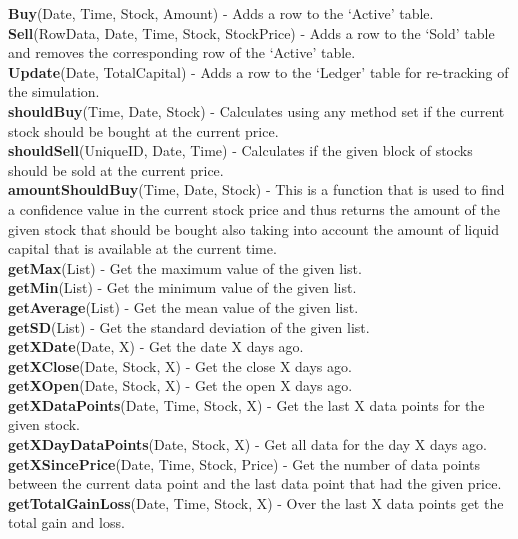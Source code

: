 \documentclass[12pt,a4paper]{article}
\begin{document}
\noindent
\textbf{Buy}(Date, Time, Stock, Amount) - Adds a row to the `Active' table. \\
\noindent
\textbf{Sell}(RowData, Date, Time, Stock, StockPrice) - Adds a row to the `Sold' table and removes the corresponding row of the `Active' table.\\
\noindent
\textbf{Update}(Date, TotalCapital) - Adds a row to the `Ledger' table for re-tracking of the simulation.\\
\noindent
\textbf{shouldBuy}(Time, Date, Stock) - Calculates using any method set if the current stock should be bought at the current price.\\
\noindent
\textbf{shouldSell}(UniqueID, Date, Time) - Calculates if the given block of stocks should be sold at the current price.\\
\noindent
\textbf{amountShouldBuy}(Time, Date, Stock) - This is a function that is used to find a confidence value in the current stock price and thus returns the amount of the given stock that should be bought also taking into account the amount of liquid capital that is available at the current time.\\
\noindent
\textbf{getMax}(List) - Get the maximum value of the given list.\\
\noindent
\textbf{getMin}(List) - Get the minimum value of the given list.\\
\noindent
\textbf{getAverage}(List) - Get the mean value of the given list.\\
\noindent
\textbf{getSD}(List) - Get the standard deviation of the given list.\\
\noindent
\textbf{getXDate}(Date, X) - Get the date X days ago.\\
\noindent
\textbf{getXClose}(Date, Stock, X) - Get the close X days ago.\\
\noindent
\textbf{getXOpen}(Date, Stock, X) - Get the open X days ago.\\
\noindent
\textbf{getXDataPoints}(Date, Time, Stock, X) - Get the last X data points for the given stock.\\
\noindent
\textbf{getXDayDataPoints}(Date, Stock, X) - Get all data for the day X days ago.\\
\noindent
\textbf{getXSincePrice}(Date, Time, Stock, Price) - Get the number of data points between the current data point and the last data point that had the given price.\\
\noindent
\textbf{getTotalGainLoss}(Date, Time, Stock, X) - Over the last X data points get the total gain and loss.\\
\end{document}
